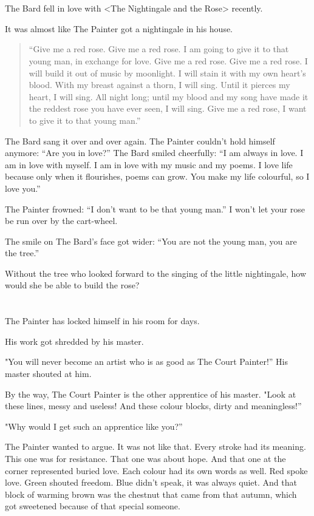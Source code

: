 \documentclass{article}
\begin{document}
\section{} %
\par The Bard fell in love with <The Nightingale and the Rose> recently.
\par It was almost like The Painter got a nightingale in his house.
\begin{quote}
“Give me a red rose. Give me a red rose. I am going to give it to that young man, in exchange for love. Give me a red rose. Give me a red rose. I will build it out of music by moonlight. I will stain it with my own heart's blood. With my breast against a thorn, I will sing. Until it pierces my heart, I will sing. All night long; until my blood and my song have made it the reddest rose you have ever seen, I will sing.
Give me a red rose, I want to give it to that young man.”
\end{quote}
\par The Bard sang it over and over again.
The Painter couldn't hold himself anymore: “Are you in love?”
The Bard smiled cheerfully: “I am always in love. I am in love with myself. I am in love with my music and my poems. I love life because only when it flourishes, poems can grow. You make my life colourful, so I love you.”
\par The Painter frowned: “I don't want to be that young man.” I won't let your rose be run over by the cart-wheel.
\par The smile on The Bard's face got wider: “You are not the young man, you are the tree.”
\par Without the tree who looked forward to the singing of the little nightingale, how would she be able to build the rose?

\section{} %
\par The Painter has locked himself in his room for days.
\par His work got shredded by his master.
\par "You will never become an artist who is as good as The Court Painter!” His master shouted at him.
\par By the way, The Court Painter is the other apprentice of his master.
"Look at these lines, messy and useless! And these colour blocks, dirty and meaningless!”
\par "Why would I get such an apprentice like you?”
\par The Painter wanted to argue. It was not like that. Every stroke had its meaning. This one was for resistance. That one was about hope. And that one at the corner represented buried love. Each colour had its own words as well. Red spoke love. Green shouted freedom. Blue didn't speak, it was always quiet. And that block of warming brown was the chestnut that came from that autumn, which got sweetened because of that special someone.
\end{document}
